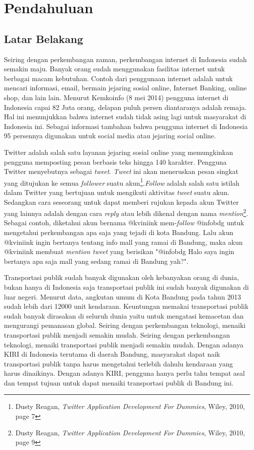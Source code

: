 \chapter{Pendahuluan}
\label{chap:pendahuluan}

\section{Latar Belakang}
\label{sec:latar belakang}

Seiring dengan perkembangan zaman, perkembangan internet di Indonesia sudah semakin maju.  Banyak orang sudah menggunakan fasilitas internet untuk berbagai macam kebutuhan. Contoh dari penggunaan internet adalah untuk mencari informasi, email, bermain jejaring sosial online, Internet Banking, online shop, dan lain lain. Menurut Kemkoinfo	(8 mei 2014)	 pengguna internet di Indonesia capai 82 Juta orang, delapan puluh persen diantaranya adalah remaja. Hal ini menunjukkan bahwa internet sudah tidak asing lagi untuk masyarakat di Indonesia ini. Sebagai informasi tambahan bahwa pengguna internet di Indonesia 95 persennya digunakan untuk social media atau jejaring social online.

Twitter adalah salah satu layanan jejaring sosial online yang memungkinkan pengguna memposting pesan berbasis teks hingga 140 karakter. Pengguna Twitter menyebutnya sebagai \textit{tweet}. \textit{Tweet} ini akan meneruskan pesan singkat yang ditujukan ke semua \textit{follower} suatu akun\footnote{Dusty Reagan, \textit{Twitter Application Development For Dummies}, Wiley, 2010, page 7}.\textit{Follow} adalah salah satu istilah dalam Twitter yang bertujuan untuk mengikuti aktivitas \textit{tweet} suatu akun. Sedangkan cara seseorang untuk dapat memberi rujukan kepada akun Twitter yang lainnya adalah dengan cara \textit{reply} atau lebih dikenal dengan nama \textit{mention}\footnote{Dusty Reagan, \textit{Twitter Application Development For Dummies}, Wiley, 2010, page 9}. Sebagai contoh, diketahui akun bernama @kviniink mem-\textit{follow} @infobdg untuk mengetahui perkembangan apa saja yang tejadi di kota Bandung. Lalu akun @kviniink ingin bertanya tentang info mall yang ramai di Bandung, maka akun @kviniink membuat \textit{mention tweet} yang berisikan "@infobdg Halo saya ingin bertanya apa saja mall yang sedang ramai di Bandung yah?".

Transportasi publik sudah banyak digunakan oleh kebanyakan orang di dunia, bukan hanya di Indonesia saja transportasi publik ini sudah banyak digunakan di luar negeri. Menurut data, angkutan umum di Kota Bandung pada tahun 2013 sudah lebih dari 12000 unit kendaraan. Keuntungan memakai transportasi publik sudah banyak dirasakan di seluruh dunia yaitu untuk mengatasi kemacetan dan mengurangi pemanasan global. Seiring dengan perkembangan teknologi, menaiki transportasi publik menjadi semakin mudah. Seiring dengan perkembangan teknologi, menaiki transportasi publik menjadi semakin mudah. Dengan adanya KIRI di Indonesia terutama di daerah Bandung, masyarakat dapat naik transportasi publik tanpa harus mengetahui terlebih dahulu kendaraan yang harus dinaikinya. Dengan adanya KIRI, pengguna hanya perlu tahu tempat asal dan tempat tujuan untuk dapat menaiki transportasi publik di Bandung ini.

